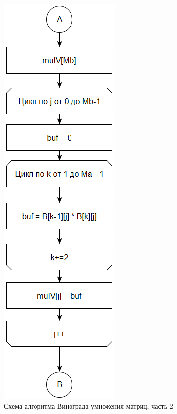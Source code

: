\documentclass[12pt]{report}
\begin{document}
\begin{figure}[h]
	\centering
	\includegraphics[scale=1]{p2.png}
	\caption{Схема алгоритма Винограда умножения матриц, часть 2}
	\label{fig:p2}
\end{figure}

\newpage
\end{document}
